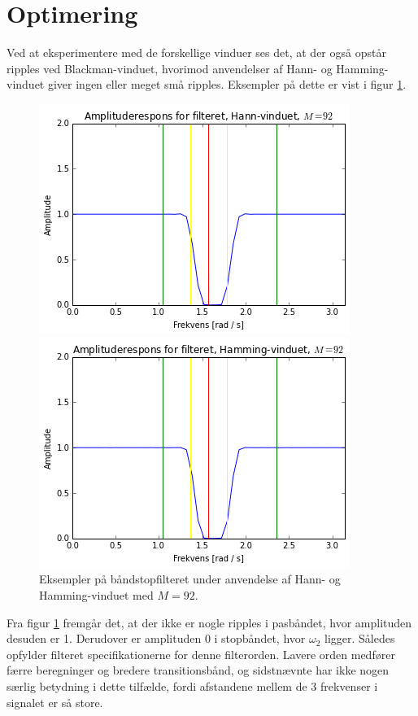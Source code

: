 \section{Optimering}
Ved at eksperimentere med de forskellige vinduer ses det, at der også opstår ripples ved Blackman-vinduet, hvorimod anvendelser af Hann- og Hamming-vinduet giver ingen eller meget små ripples. Eksempler på dette er vist i figur \ref{fig:filter_Hann_Hamming}.
\begin{figure}[H]
\begin{minipage}{0.49\textwidth}
\includegraphics[width=0.9\textwidth]{figures/Filter_Hann_92.PNG}
\end{minipage}
\begin{minipage}{0.49\textwidth}
\includegraphics[width=0.9\textwidth]{figures/Filter_Hamming_92.PNG}
\end{minipage}
\caption{Eksempler på båndstopfilteret under anvendelse af Hann- og Hamming-vinduet med $M=92$.}
\label{fig:filter_Hann_Hamming}
\end{figure}

Fra figur \ref{fig:filter_Hann_Hamming} fremgår det, at der ikke er nogle ripples i pasbåndet, hvor amplituden desuden er 1. Derudover er amplituden 0 i stopbåndet, hvor $\omega_2$ ligger. Således opfylder filteret specifikationerne for denne filterorden. Lavere orden medfører færre beregninger og bredere transitionsbånd, og sidstnævnte har ikke nogen særlig betydning i dette tilfælde, fordi afstandene mellem de 3 frekvenser i signalet er så store.